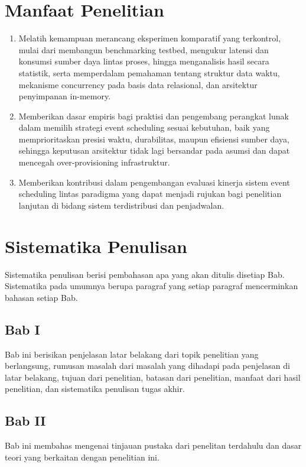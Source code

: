 \section{Manfaat Penelitian} \label{I.Manfaat}
\begin{enumerate}
	\item Melatih kemampuan merancang eksperimen komparatif yang terkontrol, mulai dari membangun benchmarking testbed, mengukur latensi dan konsumsi sumber daya lintas proses, hingga menganalisis hasil secara statistik, serta memperdalam pemahaman tentang struktur data waktu, mekanisme concurrency pada basis data relasional, dan arsitektur penyimpanan in-memory.
	\item Memberikan dasar empiris bagi praktisi dan pengembang perangkat lunak dalam memilih strategi event scheduling sesuai kebutuhan, baik yang memprioritaskan presisi waktu, durabilitas, maupun efisiensi sumber daya, sehingga keputusan arsitektur tidak lagi bersandar pada asumsi dan dapat mencegah over-provisioning infrastruktur.
	\item Memberikan kontribusi dalam pengembangan evaluasi kinerja sistem event scheduling lintas paradigma yang dapat menjadi rujukan bagi penelitian lanjutan di bidang sistem terdistribusi dan penjadwalan.
\end{enumerate}


\section{Sistematika Penulisan} \label{I.Sistematika}
Sistematika penulisan berisi pembahasan apa yang akan ditulis disetiap Bab. Sistematika pada umumnya berupa paragraf yang setiap paragraf mencerminkan bahasan setiap Bab. \par

\subsection*{Bab I}
Bab ini berisikan penjelasan latar belakang dari topik penelitian yang berlangsung, rumusan masalah dari masalah yang dihadapi pada penjelasan di latar belakang, tujuan dari penelitian, batasan dari penelitian, manfaat dari hasil penelitian, dan sistematika penulisan tugas akhir. \par

\subsection*{Bab II}
Bab ini membahas mengenai tinjauan pustaka dari penelitan terdahulu dan dasar teori yang berkaitan dengan penelitian ini.

